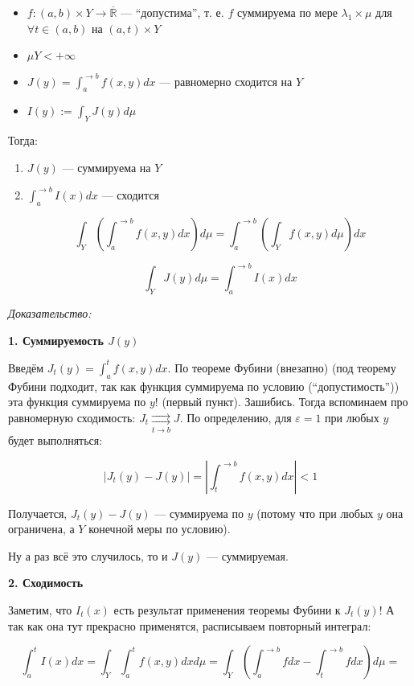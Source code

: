 \documentclass{article}
\def\rsh#1{\underset{#1}{\rightrightarrows}}
\def\rinf{\overline{\mathbb{R}}}
\begin{document}
\begin{itemize}
    \item $f: (a, b) \times Y \rightarrow \rinf$ --- ``допустима'', т. е. $f$ суммируема по мере $\lambda_1 \times \mu$ для $\forall t \in (a, b)$ на $(a, t) \times Y$ 
    \item $\mu Y < +\infty$
    \item $J(y) = \int_a^{\rightarrow b} f(x, y) dx$ --- равномерно сходится на $Y$
    \item $I(y) := \int_{Y} J(y) d\mu$
\end{itemize}

Тогда:

\begin{enumerate}
    \item $J(y)$ --- суммируема на $Y$
    \item $\int_a^{\rightarrow b} I(x) dx$ --- сходится
    
    \[\int_{Y} \left( \int_a^{\rightarrow b} f(x, y) dx\right) d\mu = \int_a^{\rightarrow b} \left( \int_{Y} f(x, y) d\mu\right) dx\]

    \[\int_{Y} J(y) d\mu = \int_a^{\rightarrow b} I(x) dx\]
\end{enumerate}

\textit{Доказательство:}

\textbf{1. Суммируемость $J(y)$}

Введём $J_t(y) = \int_a^t f(x, y) dx$. По теореме Фубини (внезапно) (под теорему Фубини подходит, так как функция суммируема по условию (``допустимость'')) эта функция суммируема по $y$! (первый пункт). Зашибись. Тогда вспоминаем про равномерную сходимость: $J_t \rsh{t \rightarrow b} J$. По определению, для $\varepsilon = 1$ при любых $y$ будет выполняться:

\[|J_t(y) - J(y)| = \left| \int_t^{\rightarrow b} f(x, y) dx\right| < 1\]

Получается, $J_t(y) - J(y)$ --- суммируема по $y$ (потому что при любых $y$ она ограничена, а $Y$ конечной меры по условию).

Ну а раз всё это случилось, то и $J(y)$ --- суммируемая.

\textbf{2. Сходимость}

Заметим, что $I_t(x)$ есть результат применения теоремы Фубини к $J_t(y)$! А так как она тут прекрасно применятся, расписываем повторный интеграл:

\[\int_a^t I(x) dx = \int_{Y} \int_a^t f(x, y) dx d\mu = \int_{Y} \left(\int_a^{\rightarrow b} f dx - \int_t^{\rightarrow b} fdx \right) d\mu = \]
\end{document}
